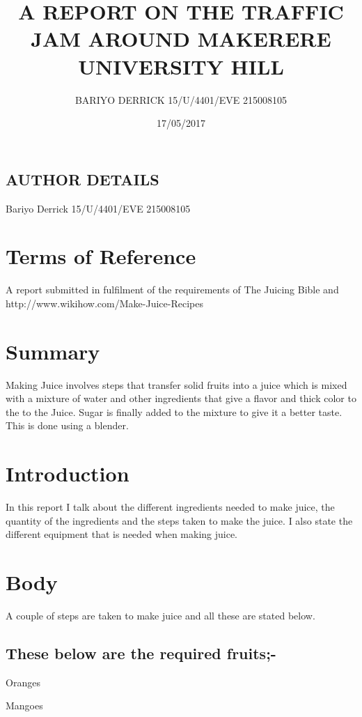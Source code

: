 \documentclass[options]{article}
\begin{document}
\title{A REPORT ON THE TRAFFIC JAM AROUND MAKERERE UNIVERSITY HILL}
\author{BARIYO DERRICK
15/U/4401/EVE
215008105}
\date{17/05/2017}
\maketitle






\subsection{\textbf{AUTHOR DETAILS}}
Bariyo Derrick 15/U/4401/EVE    215008105
\section{\textbf{Terms of Reference}}
A report submitted in fulfilment of the requirements of The Juicing Bible and
 http://www.wikihow.com/Make-Juice-Recipes

\section{\textbf{Summary}} 
Making Juice involves steps that transfer solid fruits into a juice which is mixed with a mixture of water
  and other ingredients that give a flavor and thick color to the to the Juice. Sugar is finally added to
 the mixture to give it a better taste. This is done using a blender.

\section{\textbf{Introduction}} 
In this report I talk about the different ingredients needed to make juice, the quantity of the ingredients
 and the steps taken to make the juice. 
I also state the different equipment that is needed when making juice.

\section{\textbf{Body}} 
A couple of steps are taken to make juice and all these are stated below. 
 \subsection{\textbf{These below are the required fruits;-}}  

Oranges 

Mangoes 
\end{document}
